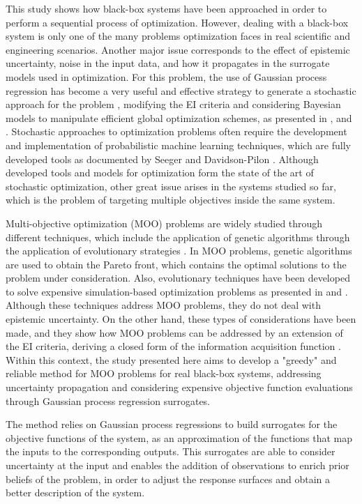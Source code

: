 \documentclass{article}
\begin{document}
This study shows how black-box systems have been approached in order to perform a sequential process of optimization. However, dealing with a black-box system is only one of the many problems optimization faces in real scientific and engineering scenarios. Another major issue corresponds to the effect of epistemic uncertainty, noise in the input data, and how it propagates in the surrogate models used in optimization. For this problem, the use of Gaussian process regression has become a very useful and effective strategy to generate a stochastic approach for the problem \cite{Wang2016}, modifying the EI criteria and considering Bayesian models to manipulate efficient global optimization schemes, as presented in \cite{Huang2006}, \cite{Pandita2016} and \cite{Li2014}. Stochastic approaches to optimization problems often require the development and implementation of probabilistic machine learning techniques, which are fully developed tools as documented by Seeger \cite{Seeger2004} and Davidson-Pilon \cite{Davidson-Pilon2014}. Although developed tools and models for optimization form the state of the art of stochastic optimization, other great issue arises in the systems studied so far, which is the problem of targeting multiple objectives inside the same system.

Multi-objective optimization (MOO) problems are widely studied through different techniques, which include the application of genetic algorithms through the application of evolutionary strategies \cite{Costa2006}. In MOO problems, genetic algorithms are used to obtain the Pareto front, which contains the optimal solutions to the problem under consideration. Also, evolutionary techniques have been developed to solve expensive simulation-based optimization problems as presented in \cite{Guo2007} and \cite{Huang2009}. Although these techniques address MOO problems, they do not deal with epistemic uncertainty. On the other hand, these types of considerations have been made, and they show how MOO problems can be addressed by an extension of the EI criteria, deriving a closed form of the information acquisition function \cite{wagner2010expected}. Within this context, the study presented here aims to develop a "greedy" and reliable method for MOO problems for real black-box systems, addressing uncertainty propagation and considering expensive objective function evaluations through Gaussian process regression surrogates.

The method relies on Gaussian process regressions to build surrogates for the objective functions of the system, as an approximation of the functions that map the inputs to the corresponding outputs. This surrogates are able to consider uncertainty at the input and enables the addition of observations to enrich prior beliefs of the problem, in order to adjust the response surfaces and obtain a better description of the system.
\end{document}
